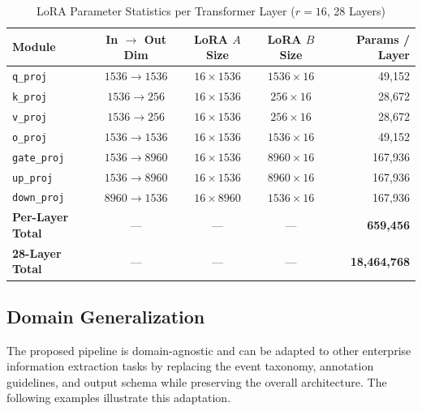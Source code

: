 \documentclass[11pt,a4paper]{article}
\begin{document}
\begin{table}[htbp]
\centering
\caption{LoRA Parameter Statistics per Transformer Layer ($r=16$, 28 Layers)}
\label{tab:lora_param_stats}
\begin{tabular}{@{}l c c c r@{}}
\toprule
\textbf{Module} & \textbf{In $\to$ Out Dim} & \textbf{LoRA $A$ Size} & \textbf{LoRA $B$ Size} & \textbf{Params / Layer} \\
\midrule
\texttt{q\_proj} & $1536 \to 1536$ & $16 \times 1536$ & $1536 \times 16$ & 49,152 \\
\texttt{k\_proj} & $1536 \to 256$ & $16 \times 1536$ & $256 \times 16$ & 28,672 \\
\texttt{v\_proj} & $1536 \to 256$ & $16 \times 1536$ & $256 \times 16$ & 28,672 \\
\texttt{o\_proj} & $1536 \to 1536$ & $16 \times 1536$ & $1536 \times 16$ & 49,152 \\
\texttt{gate\_proj} & $1536 \to 8960$ & $16 \times 1536$ & $8960 \times 16$ & 167,936 \\
\texttt{up\_proj} & $1536 \to 8960$ & $16 \times 1536$ & $8960 \times 16$ & 167,936 \\
\texttt{down\_proj} & $8960 \to 1536$ & $16 \times 8960$ & $1536 \times 16$ & 167,936 \\
\midrule
\textbf{Per-Layer Total} & --- & --- & --- & \textbf{659,456} \\
\textbf{28-Layer Total} & --- & --- & --- & \textbf{18,464,768} \\
\bottomrule
\end{tabular}
\end{table}

\subsection{Domain Generalization}
The proposed pipeline is domain-agnostic and can be adapted to other enterprise information extraction tasks by replacing the event taxonomy, annotation guidelines, and output schema while preserving the overall architecture. The following examples illustrate this adaptation.
\end{document}
